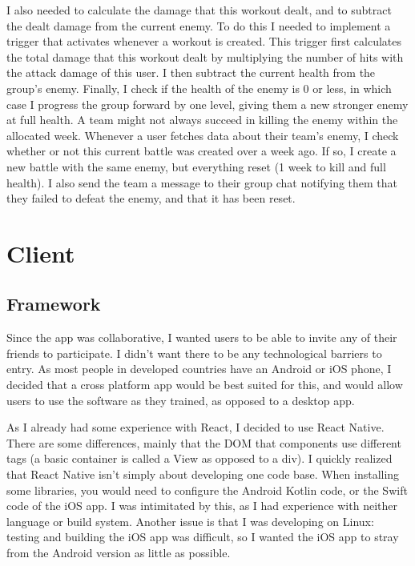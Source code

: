 \documentclass{l4proj}
\begin{document}


I also needed to calculate the damage that this workout dealt, and to subtract the dealt damage from the current enemy. To do this I needed to implement a trigger that activates whenever a workout is created. This trigger first calculates the total damage that this workout dealt by multiplying the number of hits with the attack damage of this user. I then subtract the current health from the group's enemy. Finally, I check if the health of the enemy is 0 or less, in which case I progress the group forward by one level, giving them a new stronger enemy at full health. A team might not always succeed in killing the enemy within the allocated week. Whenever a user fetches data about their team's enemy, I check whether or not this current battle was created over a week ago. If so, I create a new battle with the same enemy, but everything reset (1 week to kill and full health). I also send the team a message to their group chat notifying them that they failed to defeat the enemy, and that it has been reset.


\section{Client}
\subsection{Framework}
Since the app was collaborative, I wanted users to be able to invite any of their friends to participate. I didn't want there to be any technological barriers to entry. As most people in developed countries have an Android or iOS phone, I decided that a cross platform app would be best suited for this, and would allow users to use the software as they trained, as opposed to a desktop app. 

As I already had some experience with React, I decided to use React Native. There are some differences, mainly that the DOM that components use different tags (a basic container is called a View as opposed to a div). I quickly realized that React Native isn't simply about developing one code base. When installing some libraries, you would need to configure the Android Kotlin code, or the Swift code of the iOS app. I was intimitated by this, as I had experience with neither language or build system. Another issue is that I was developing on Linux: testing and building the iOS app was difficult, so I wanted the iOS app to stray from the Android version as little as possible.
\end{document}
